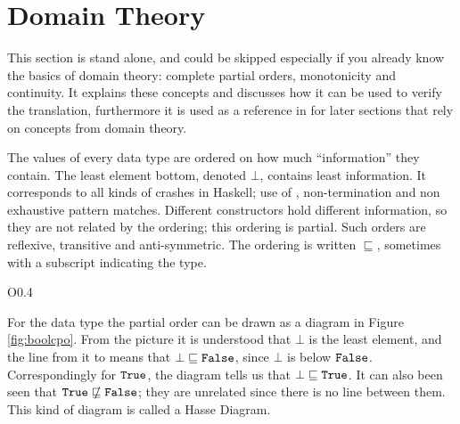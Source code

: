 \section{Domain Theory}
\label{sec:domaintheory}

This section is stand alone, and could be skipped especially if you
already know the basics of domain theory: comp\-lete partial orders,
monotonicity and continuity.  It explains these concepts and discusses
how it can be used to verify the translation, furthermore it is used
as a reference in for later sections that rely on concepts from domain
theory.

The values of every data type are ordered on how much ``information''
they contain. The least element bottom, denoted $\bot$, contains least
information. It corresponds to all kinds of crashes in Haskell; use of
, non-termination and non exhaustive pattern matches.
Different constructors hold different information, so they are not
related by the ordering; this ordering is partial. Such orders are
reflexive, transitive and anti-symmetric. The ordering is written
$\sqsubseteq$, sometimes with a subscript indicating the type.

\begin{wrapfigure}{O}{0.4\textwidth} %
\vspace{-7pt}
\centering 
\vspace{-7pt}
\caption{
    The order of  values.
    \label{fig:boolcpo}
}
\end{wrapfigure}
For the  data type the partial order can be drawn as a
diagram in Figure \ref{fig:boolcpo}.  From the picture it is
understood that $\bot$ is the least element, and the line from it to
 means that $\bot \sqsubseteq \texttt{False}$, since $\bot$ is
below $\texttt{False}$. Correspondingly for $\texttt{True}$, the diagram tells
us that $\bot \sqsubseteq \texttt{True}$. It can also been seen that
$\texttt{True} \,\,\, /\!\!\!\!\!\!\sqsubseteq \texttt{False}$; they are unrelated since there is
no line between them. This kind of diagram is called a Hasse Diagram.

%


